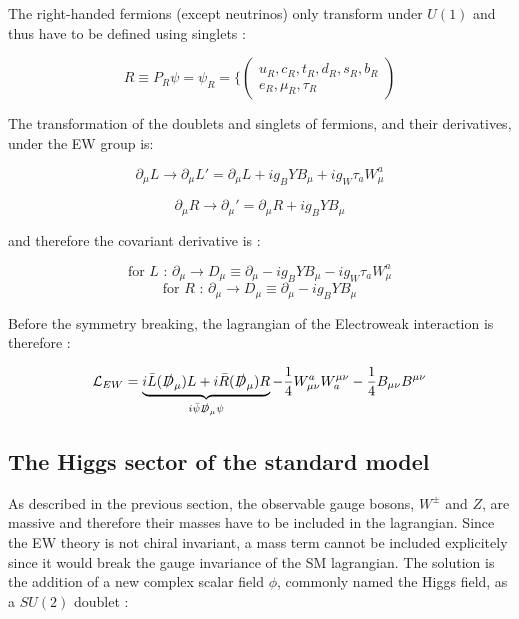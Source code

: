 The right-handed fermions (except neutrinos) only transform under $U(1)$ and thus have to be defined using singlets :

\begin{equation}
    R \equiv P_R \psi = \psi_R = \Bigg\{ \begin{pmatrix} u_R,c_R,t_R,d_R,s_R,b_R \\ e_R,\mu_R,\tau_R \end{pmatrix}
\end{equation}

The transformation of the doublets and singlets of fermions, and their derivatives, under the EW group is:

\begin{equation}
    \partial_{\mu}L \rightarrow \partial_{\mu}L' = \partial_{\mu}L + ig_B YB_{\mu} + ig_W \tau_a W_{\mu}^a
\end{equation}

\begin{equation}
    \partial_{\mu}R \rightarrow \partial_{\mu}' = \partial_{\mu}R + ig_B Y B_{\mu}
\end{equation}

and therefore the covariant derivative is :

\begin{equation}
    \text{for $L$ :       } \partial_{\mu} \rightarrow D_{\mu} \equiv \partial_{\mu} - ig_B Y B_{\mu} - ig_W \tau_a W_{\mu}^a
\end{equation}
\begin{equation}
    \text{for $R$ :       } \partial_{\mu} \rightarrow D_{\mu} \equiv \partial_{\mu} - ig_B Y B_{\mu}
\end{equation}

Before the symmetry breaking, the lagrangian of the Electroweak interaction is therefore :

\begin{equation}
    \mathcal{L}_{EW} = \underbrace{i\Bar{L}(\slashed{D}_{\mu})L + i\Bar{R}(\slashed{D}_{\mu})R}_{i\Bar{\psi}\slashed{D}_{\mu}\psi} -\frac{1}{4}W_{\mu\nu}^a W^{\mu\nu}_a - \frac{1}{4}B_{\mu\nu}B^{\mu\nu}
\end{equation}

\subsection{The Higgs sector of the standard model}
\label{sec:SM_higgs}

As described in the previous section, the observable gauge bosons, $W^{\pm}$ and $Z$, are massive and therefore their masses have to be included in the lagrangian. Since the EW theory is not chiral invariant, a mass term cannot be included explicitely since it would break the gauge invariance of the SM lagrangian. The solution \cite{PhysRevLett.13.508} is the addition of a new complex scalar field $\phi$, commonly named the Higgs field, as a $SU(2)$ doublet :

